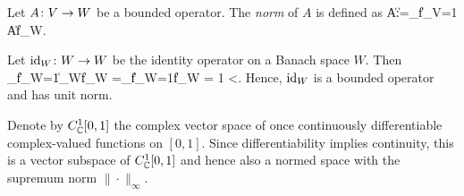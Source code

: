 \bd
Let $A\colon V \to W$ be a bounded operator. The \emph{norm} of $A$ is defined as
\bse
\|A\|:=\sup_{\|f\|_V=1} \|Af\|_W.
\ese
\ed

\be
Let $\operatorname{id}_W\colon W\to W$ be the identity operator on a Banach space $W$. Then
\bse
\sup_{\|f\|_W=1}\|\id_Wf\|_W =\sup_{\|f\|_W=1}\|f\|_W = 1 <\infty.
\ese
Hence, $\operatorname{id}_W$ is a bounded operator and has unit norm.
\ee

\be
Denote by $C^1_{\mathbb{C}}[0,1]$ the complex vector space of once continuously differentiable complex-valued functions on $[0,1]$. Since differentiability implies continuity, this is a vector subspace of $C^1_{\mathbb{C}}[0,1]$ and hence also a normed space with the supremum norm $\|\cdot\|_{\infty}$.


\ee






























